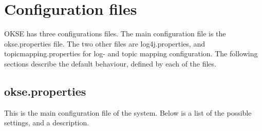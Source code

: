 \section{Configuration files}
\label{sec:configuration_files}
OKSE has three configurations files. The main configuration file is the okse.properties file. The two other files are log4j.properties, and topicmapping.properties for log- and topic mapping configuration. The following sections describe the default behaviour, defined by each of the files.

\subsection{okse.properties}
\label{subsec:configuration_files-okse.properties}
 
This is the main configuration file of the system. Below is a list of the possible settings, and a description.


